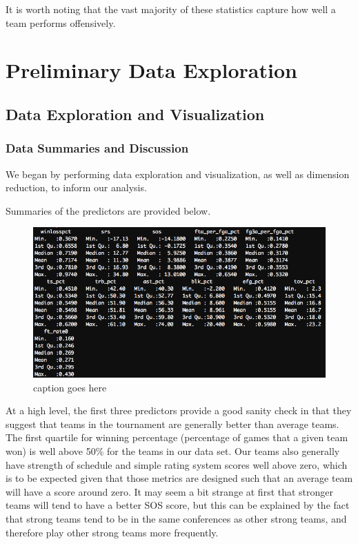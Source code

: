 \documentclass[10pt,a4paper, hidelinks]{article} %
\begin{document}
It is worth noting that the vast majority of these statistics capture how well a team performs offensively.  

\section{Preliminary Data Exploration}

\subsection{Data Exploration and Visualization}

\subsubsection{Data Summaries and Discussion}

We began by performing data exploration and visualization, as well as dimension reduction, to inform our analysis.

Summaries of the predictors are provided below.

\begin{figure}[H]
	\centering
	\includegraphics[width=0.7\linewidth]{../fig/Summary}
	\caption{caption goes here}
	\label{fig:summary}
\end{figure} 

At a high level, the first three predictors provide a good sanity check in that they suggest that  teams in the tournament are generally better than average teams. The first quartile for winning percentage (percentage of games that a given team won) is well above 50\% for the teams in our data set. Our teams also generally have strength of schedule and simple rating system scores well above zero, which is to be expected given that those metrics are designed such that an average team will have a score around zero. It may seem a bit strange at first that stronger teams will tend to have a better SOS score, but this can be explained by the fact that strong teams tend to be in the same conferences as other strong teams, and therefore play other strong teams more frequently.
\end{document}
